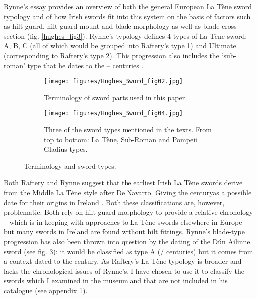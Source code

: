 Rynne’s \citeyear{Rynne1982} essay provides an overview of both the general European La Tène sword typology and of how Irish swords fit into this system on the basis of factors such as hilt-guard, hilt-guard mount and blade morphology as well as blade cross-section (fig. \ref{hughes_fig3}). 
Rynne’s typology defines 4 types of La Tène sword: A, B, C (all of which would be grouped into Raftery’s type 1) and Ultimate (corresponding to Raftery’s type 2). 
This progression also includes the ‘sub-roman’ type that he dates to the -- centuries \parencite[95]{Rynne1982}.


\begin{figure}[!tb]
\begin{subfigure}[b]{0.45\textwidth}
\texttt{[image: figures/Hughes\_Sword\_fig02.jpg]} 
\caption{Terminology of sword parts used in this paper}
\label{hughes_fig2}
\end{subfigure}
\hfill
\begin{subfigure}[b]{0.45\textwidth}
\texttt{[image: figures/Hughes\_Sword\_fig04.jpg]} 
\caption{Three of the sword types mentioned in the texts. From top to bottom: La Tène, Sub-Roman and Pompeii Gladius types.}
\label{hughes_fig4}
\end{subfigure}
\caption{Terminology and sword types.}
\end{figure}

Both Raftery and Rynne suggest that the earliest Irish La Tène swords derive from the Middle La Tène style after De Navarro. Giving the  century\BC as a possible date for their origins in Ireland \parencites{DeNavarro1972}{Rynne1982}[83]{Raftery1983}. 
Both these classifications are, however, problematic. 
Both rely on hilt-guard morphology to provide a relative chronology -- which is in keeping with approaches to La Tène swords elsewhere in Europe 
\parencites(e.g.)(){DeNavarro1972}{Stead2006} -- but many swords in Ireland are found without hilt fittings. 
Rynne’s blade-type progression has also been thrown into question by the dating of the Dún Ailinne sword (see fig. \ref{hughes_fig4}): 
it would be classified as type A (/ centuries\BC) but it comes from a context dated to the  century\AD \parencite[88\psq]{Johnston2007}. 
As Raftery’s La Tène typology is broader and lacks the chronological issues of Rynne’s, I have chosen to use it to classify the swords which I examined in the museum and that are not included in his catalogue \parencite{Raftery1983} (see appendix 1).

